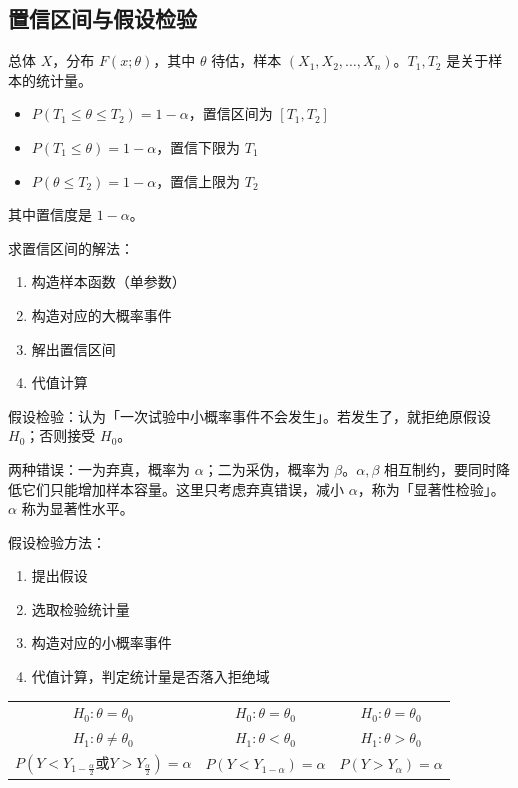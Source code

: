 \documentclass[UTF8]{ctexart}
\newcommand\Concept[1]{\textcolor{cyan!70!black}{#1}}
\begin{document}
\subsection{置信区间与假设检验}
总体 $X$，分布 $F(x;\theta)$，其中 $\theta$ 待估，样本 $(X_1,X_2,\dots,X_n)$。$T_1,T_2$ 是关于样本的统计量。
\begin{itemize}[itemsep=0pt,parsep=0pt]
  \item $P(T_1\leqslant \theta\leqslant T_2) = 1-\alpha$，\Concept{置信区间}为 $[T_1,T_2]$
  \item $P(T_1\leqslant \theta)=1-\alpha$，置信下限为 $T_1$
  \item $P(\theta\leqslant T_2)=1-\alpha$，置信上限为 $T_2$
\end{itemize}
其中置信度是 $1-\alpha$。

求置信区间的解法：
\begin{enumerate}[itemsep=0pt,parsep=0pt]
  \item 构造样本函数（单参数）
  \item 构造对应的大概率事件
  \item 解出置信区间
  \item 代值计算
\end{enumerate}

\Concept{假设检验}：认为「一次试验中小概率事件不会发生」。若发生了，就拒绝原假设 $H_0$；否则接受 $H_0$。

两种错误：一为弃真，概率为 $\alpha$；二为采伪，概率为 $\beta$。$\alpha,\beta$ 相互制约，要同时降低它们只能增加样本容量。这里只考虑弃真错误，减小 $\alpha$，称为「显著性检验」。$\alpha$ 称为显著性水平。

假设检验方法：
\begin{enumerate}[itemsep=0pt,parsep=0pt]
  \item 提出假设
  \item 选取检验统计量
  \item 构造对应的小概率事件
  \item 代值计算，判定统计量是否落入拒绝域
\end{enumerate}

\begin{table}[htb]
  \centering
  \begin{tabular}{c|c|c}
  $H_0:\theta=\theta_0$ & $H_0:\theta=\theta_0$ & $H_0:\theta=\theta_0$ \\
  $H_1:\theta\ne\theta_0$ & $H_1:\theta<\theta_0$ & $H_1:\theta>\theta_0$ \\
  $P(Y<Y_{1-\frac{\alpha}2} \text{或} Y>Y_{\frac{\alpha}2}) = \alpha$ & $P(Y<Y_{1-\alpha})  = \alpha$ & $P(Y>Y_\alpha)  = \alpha$ \\
  \end{tabular}
\end{table}
\end{document}
